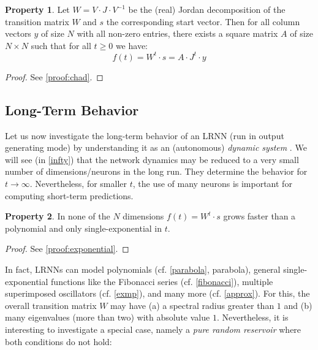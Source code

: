 \documentclass[preprint,12pt,times,authoryear]{elsarticle}%
\theoremstyle{definition}
\newtheorem{prop}{Property}
\begin{document}
\begin{prop}\label{chad}
Let $W = V \cdot J \cdot V^{-1}$ be the (real) Jordan decomposition of the
transition matrix $W$ and $s$ the corresponding start vector. Then for all
column vectors $y$ of size $N$ with all non-zero entries, there exists a square
matrix $A$ of size $N \times N$ such that for all $t \ge 0$ we have:
\[ f(t) = W^t \cdot s = A \cdot J^t \cdot y \]
\end{prop}

\begin{proof}
See \ref{proof:chad}.
\end{proof}

\subsection{Long-Term Behavior}\label{ellipse}

Let us now investigate the long-term behavior of an LRNN (run in output generating
mode) by understanding it as an (autonomous) \emph{dynamic system} \citep{CK14,Str15}.
We will see (in \cref{infty}) that the network dynamics may be reduced to a
very small number of dimensions/neurons in the long run. They determine the behavior for $t
\to \infty$. Nevertheless, for smaller $t$, the use of many neurons is important
for computing short-term predictions.

\begin{prop}\label{exponential}
In none of the $N$ dimensions $f(t) = W^t \cdot s$ grows faster than a
polynomial and only single-exponential in $t$.
\end{prop}

\begin{proof}
See \ref{proof:exponential}.
\end{proof}

In fact, LRNNs can model polynomials (cf. \cref{parabola}, parabola), general
single-exponential functions like the Fibonacci series (cf. \cref{fibonacci}),
multiple superimposed oscillators (cf. \cref{exmp}), and many more (cf.
\cref{approx}). For this, the overall transition matrix $W$ may have (a) a
spectral radius greater than $1$ and (b) many eigenvalues (more than two) with
absolute value $1$. Nevertheless, it is interesting to investigate a special
case, namely a \emph{pure random reservoir} where both conditions do not hold:
\end{document}
